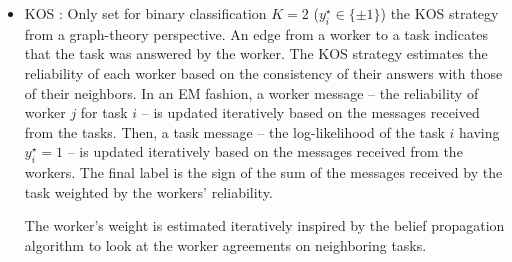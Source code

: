\documentclass{cap2024}
\begin{document}
\begin{itemize}
  \item KOS \citep{karger2011iterative}: Only set for binary classification $K=2$ ($y_i^\star\in\{\pm 1\}$) the KOS strategy from a graph-theory perspective.
  An edge from a worker to a task indicates that the task was answered by the worker.
  The KOS strategy estimates the reliability of each worker based on the consistency of their answers with those of their neighbors.
  In an EM fashion, a worker message -- the reliability of worker $j$ for task $i$ -- is updated iteratively based on the messages received from the tasks.
  Then, a task message -- the log-likelihood of the task $i$ having $y_i^\star=1$ -- is updated iteratively based on the messages received from the workers.
  The final label is the sign of the sum of the messages received by the task weighted by the workers' reliability.


  The worker's weight is estimated iteratively inspired by the belief propagation algorithm \citep{pearlBelief} to look at the worker agreements on neighboring tasks.

\end{itemize}
\end{document}

